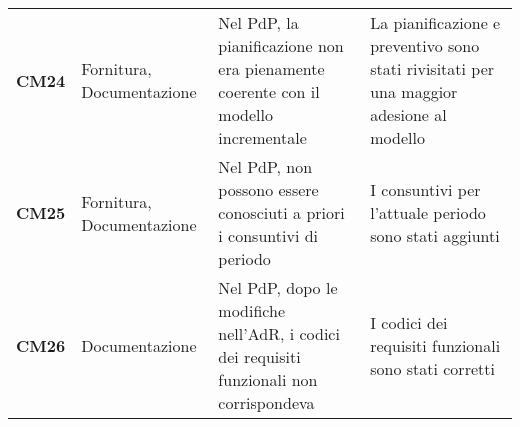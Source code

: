 \documentclass[../piano-di-qualifica.tex]{subfiles}
\begin{document}
\begin{longtable}[H]{>{\centering\bfseries}m{2.5cm} >{\centering}m{2.5cm} >{\centering}m{5.5cm} >{\centering\arraybackslash}m{5.5cm}}
CM24 & Fornitura, Documentazione                     & Nel PdP, la pianificazione non era pienamente coerente con il modello incrementale                                                                                            & La pianificazione e preventivo sono stati rivisitati per una maggior adesione al modello                                                                                                                                                                                                                                                            \\
CM25 & Fornitura, Documentazione                     & Nel PdP, non possono essere conosciuti a priori i consuntivi di periodo                                                                                                       & I consuntivi per l’attuale periodo sono stati aggiunti                                                                                                                                                                                                                                                                                              \\
CM26 & Documentazione                                & Nel PdP, dopo le modifiche nell’AdR, i codici dei requisiti funzionali non corrispondeva                                                                                      & I codici dei requisiti funzionali sono stati corretti

\end{longtable}
\end{document}
